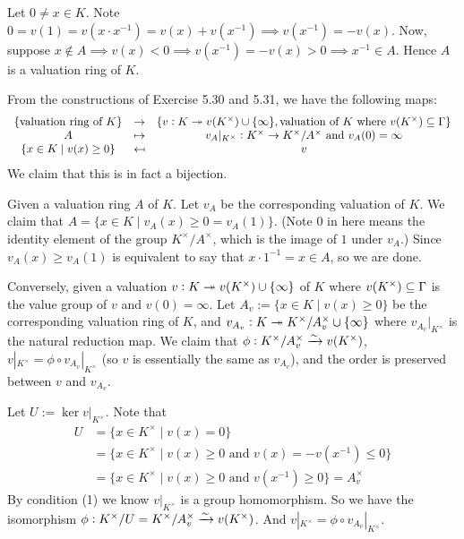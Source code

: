 \documentclass[../A&M.tex]{subfiles}
\begin{document}
Let $0 \neq x \in K$. Note $0 = v(1) = v(x\cdot x^{-1}) = v(x) + v(x^{-1}) \implies v(x^{-1}) = -v(x)$. Now, suppose $x\notin A \implies v(x) < 0 \implies v(x^{-1}) = -v(x) > 0 \implies x^{-1} \in A$. Hence $A$ is a valuation ring of $K$.

From the constructions of Exercise 5.30 and 5.31, we have the following maps:
$$
\begin{array}{ccc}
\{ \text{valuation ring of } K\} & \to & \{v:K \twoheadrightarrow v(K^\times) \cup \{\infty\}, \text{valuation of } K \text{ where } v(K^\times) \subseteq \Gamma \}   \\
A & \mapsto & v_A|_{K^\times}: K^\times \to K^\times/A^\times \text{ and } v_A(0) = \infty     \\
\{x \in K \mid v(x) \geq 0\} & \mapsfrom & v
\end{array}
$$
We claim that this is in fact a bijection.

Given a valuation ring $A$ of $K$. Let $v_A$ be the corresponding valuation of $K$. We claim that $A = \{ x\in K \mid v_A(x) \geq 0 = v_A(1) \}$. (Note $0$ in here means the identity element of the group $K^\times/A^\times$, which is the image of $1$ under $v_A$.) Since $v_A(x) \geq v_A(1)$ is equivalent to say that $x \cdot 1^{-1} = x \in A$, so we are done.

Conversely, given a valuation $v:K \twoheadrightarrow v(K^\times) \cup \{\infty\}$ of $K$ where $v(K^\times) \subseteq \Gamma$ is the value group of $v$ and $v(0)=\infty$. Let $A_v := \{x \in K \mid v(x) \geq 0\}$ be the corresponding valuation ring of $K$, and $v_{A_v}: K \twoheadrightarrow K^\times/A_v^\times \cup \{\infty\}$ where $v_{A_v}|_{K^\times}$ is the natural reduction map. We claim that $\phi: K^\times/A_v^\times \xrightarrow{\sim} v(K^\times)  $, $v|_{K^\times} = \phi \circ v_{A_v}|_{K^\times}$ (so $v$ is essentially the same as $v_{A_v}$), and the order is preserved between $v$ and $v_{A_v}$.

Let $U:=\ker v|_{K^\times}$. Note that
\begin{align*}
U &= \{ x \in K^\times \mid v(x)=0 \}    \\
&= \{ x \in K^\times \mid v(x) \geq 0 \text{ and } v(x) = -v(x^{-1}) \leq 0 \}     \\
&= \{ x \in K^\times \mid v(x) \geq 0 \text{ and } v(x^{-1}) \geq 0 \} 
= A_v^\times  
\end{align*}
By condition (1) we know $v|_{K^\times}$ is a group homomorphism. So we have the isomorphism $\phi: K^\times/U = K^\times/A_v^\times \xrightarrow{\sim} v(K^\times)$. And $v|_{K^\times} = \phi \circ v_{A_v}|_{K^\times}$.
\end{document}

